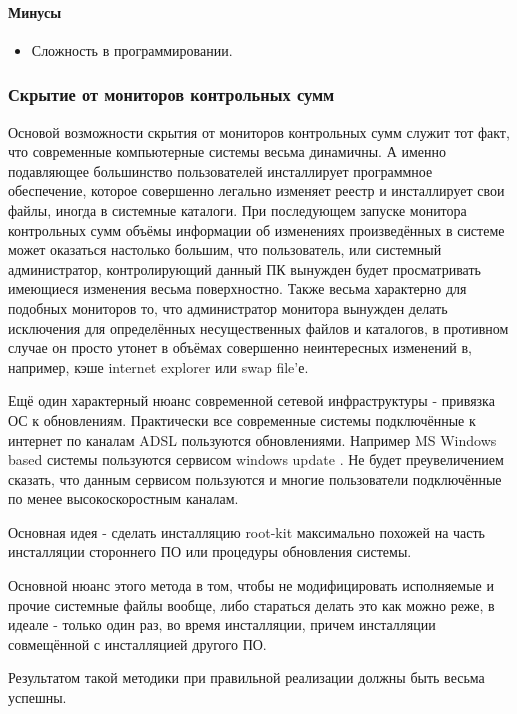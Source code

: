 \paragraph{Минусы\\}

\begin{itemize}
\item{Сложность в программировании.}
\end{itemize}


\subsubsection {Скрытие от мониторов контрольных сумм}

Основой возможности скрытия от мониторов контрольных сумм служит тот
факт, что современные компьютерные системы весьма динамичны. А именно
подавляющее большинство пользователей инсталлирует программное
обеспечение, которое совершенно легально изменяет реестр и инсталлирует
свои файлы, иногда в системные каталоги.  При последующем  запуске
монитора контрольных сумм объёмы информации об изменениях произведённых
в системе может оказаться настолько большим, что пользователь, или
системный администратор, контролирующий данный ПК вынужден будет
просматривать имеющиеся изменения весьма поверхностно. Также весьма
характерно для подобных мониторов то, что  администратор  монитора
вынужден делать исключения для определённых несущественных файлов и
каталогов, в противном случае он просто утонет в объёмах совершенно
неинтересных изменений в, например, кэше internet explorer или swap
file'е.

Ещё один характерный нюанс современной сетевой инфраструктуры - привязка
ОС к обновлениям. Практически все современные системы подключённые к
интернет по каналам ADSL пользуются обновлениями. Например MS Windows
based системы пользуются сервисом windows update . Не будет
преувеличением сказать, что данным сервисом пользуются и многие
пользователи подключённые по менее высокоскоростным каналам.

Основная идея - сделать инсталляцию root-kit максимально похожей на
часть инсталляции стороннего ПО или процедуры обновления системы.

Основной нюанс этого метода в том, чтобы не модифицировать исполняемые и
прочие системные файлы вообще, либо стараться делать это как можно реже,
в идеале - только один раз, во время инсталляции, причем инсталляции
совмещённой с инсталляцией другого ПО.

Результатом такой методики при правильной реализации должны быть весьма
 успешны.

